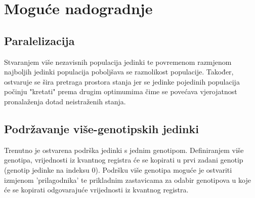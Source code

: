 \documentclass[times, utf8, zavrsni, numeric]{fer}
\begin{document}
%
%

\chapter{Moguće nadogradnje} \label{ch:nadogradnja}
\section{Paralelizacija}
Stvaranjem više nezavisnih populacija jedinki te povremenom razmjenom najboljih jedinki populacija poboljšava se raznolikost populacije. Također, ostvaruje se šira pretraga prostora stanja jer se jedinke pojedinih populacija počinju "kretati" prema drugim optimumima čime se povećava vjerojatnost pronalaženja dotad neistraženih stanja. \citep{han_phd}

\section{Podržavanje više-genotipskih jedinki}
Trenutno je ostvarena podrška jedinki s jednim genotipom. Definiranjem više genotipa, vrijednosti iz kvantnog registra će se kopirati u prvi zadani genotip (genotip jedinke na indeksu 0). Podršku više genotipa moguće je ostvariti izmjenom 'prilagodnika'  te prikladnim zastavicama za odabir genotipova u koje će se kopirati odgovarajuće vrijednosti iz kvantnog registra.
\end{document}
